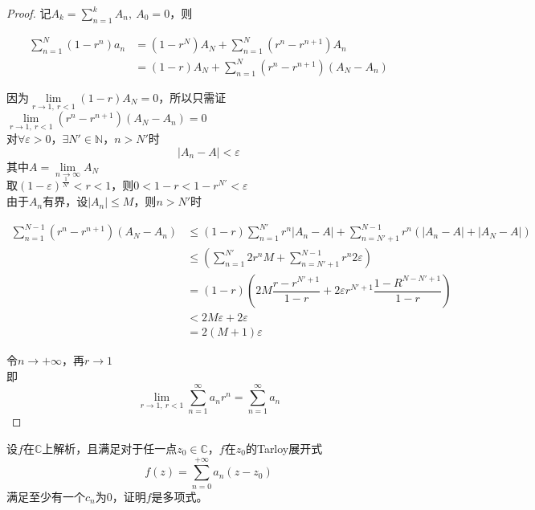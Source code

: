 \begin{proof}
    
    记$A_k = \sum\limits_{n = 1}^{k}{A_n},\ A_0 = 0$，则

    \begin{align*}
        \sum_{n=1}^{N}{(1-r^n)a_n} & = (1-r^N)A_N + \sum_{n=1}^{N}{(r^n-r^{n+1})A_n}\\
        & = (1 - r)A_N + \sum_{n=1}^{N}{(r^n-r^{n+1})(A_N - A_n)}
    \end{align*}

    因为$\lim\limits_{r \to 1,\ r < 1}{(1 - r)A_N} = 0$，所以只需证$\lim\limits_{r \to 1,\ r < 1}{(r^n-r^{n+1})(A_N - A_n)} = 0$\\
    对$\forall \varepsilon > 0 $，$\exists N' \in \mathbb{N}$，$n > N'$时
    $$|A_n - A| < \varepsilon $$
    其中$A = \lim\limits_{n\to\infty}{A_N}$\\
    取$(1-\varepsilon)^{\frac{1}{N'}} < r < 1$，则$0 < 1 - r < 1 - r^{N'} < \varepsilon $\\
    由于$A_n$有界，设$|A_n| \leq M $，则$n > N'$时
    
    \begin{align*}
        \sum_{n=1}^{N-1}{(r^n - r^{n+1})(A_N - A_n)} & \leq (1 - r)\sum_{n=1}^{N'}{r^n|A_n - A|} + \sum_{n=N'+1}^{N-1}{r^n(|A_n - A| + |A_N -A|)}\\
        & \leq (\sum_{n=1}^{N'}{2r^nM} + \sum_{n=N'+1}^{N-1}{r^n2\varepsilon})\\
        & = (1 - r)\left(2M\dfrac{r - r^{N'+1}}{1 - r} + 2\varepsilon r^{N'+1}\dfrac{1 - R^{N-N'+1}}{1 - r}\right)\\
        & < 2M\varepsilon + 2\varepsilon\\
        & = 2(M+1)\varepsilon
    \end{align*}

    令$n\to+\infty$，再$r\to1$\\
    即
    $$\lim_{r \to 1,\ r < 1}{\sum\limits_{n=1}^{\infty}{a_nr^n}} = \sum_{n=1}^{\infty}{a_n}$$

\end{proof}

\begin{proposition}
    
    设$f$在$\mathbb{C}$上解析，且满足对于任一点$z_0\in\mathbb{C}$，$f$在$z_0$的\textup{Tarloy}展开式
    $$f(z) = \sum_{n=0}^{+\infty}{a_n(z-z_0)}$$
    满足至少有一个$c_n$为$0$，证明$f$是多项式。

\end{proposition}

